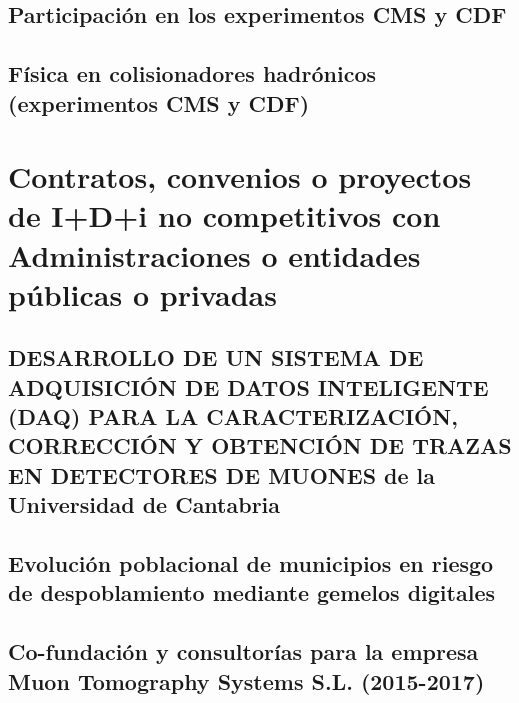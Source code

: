 \documentclass[a4paper, 11pt, twoside, openright]{report}
\begin{document}
\subsection{Participación en los experimentos CMS y CDF}


\subsection{Física en colisionadores hadrónicos (experimentos CMS y CDF)}




\section{Contratos, convenios o proyectos de I+D+i no competitivos con Administraciones o entidades públicas o privadas}

\subsection{DESARROLLO DE UN SISTEMA DE ADQUISICIÓN DE DATOS INTELIGENTE (DAQ) PARA LA CARACTERIZACIÓN, CORRECCIÓN Y OBTENCIÓN DE TRAZAS EN DETECTORES DE MUONES de la Universidad de Cantabria}


\subsection{Evolución poblacional de municipios en riesgo de despoblamiento mediante gemelos digitales}


\subsection{Co-fundación y consultorías para la empresa Muon Tomography Systems S.L. (2015-2017)}

\end{document}
